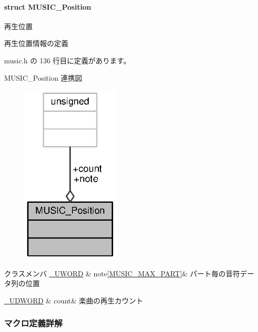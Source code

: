 \paragraph{struct M\+U\+S\+I\+C\+\_\+\+Position}
再生位置 

再生位置情報の定義 

 music.\+h の 136 行目に定義があります。



M\+U\+S\+I\+C\+\_\+\+Position 連携図
\nopagebreak
\begin{figure}[H]
\begin{center}
\leavevmode
\includegraphics[width=134pt]{da/d84/structMUSIC__Position__coll__graph}
\end{center}
\end{figure}
\begin{DoxyFields}{クラスメンバ}
\hyperlink{stddef_8h_af4b45f5ec97da370bd2173b4fe891d76_af4b45f5ec97da370bd2173b4fe891d76}{\+\_\+\+U\+W\+O\+R\+D}\label{music_8h_a1125dd2805c17a4780d5d8383af58261}
&
note\mbox{[}\hyperlink{music_8h_a219b820b86dd148d59b29a762f1d775a_a219b820b86dd148d59b29a762f1d775a}{M\+U\+S\+I\+C\+\_\+\+M\+A\+X\+\_\+\+P\+A\+R\+T}\mbox{]}&
パート毎の音符データ列の位置 \\
\hline

\hyperlink{stddef_8h_a1fd04328ad1e5a3e83788b99cddc35dd_a1fd04328ad1e5a3e83788b99cddc35dd}{\+\_\+\+U\+D\+W\+O\+R\+D}\label{music_8h_af92c102791e74260155ab93bd6e303bd}
&
count&
楽曲の再生カウント \\
\hline

\end{DoxyFields}


\subsubsection{マクロ定義詳解}
